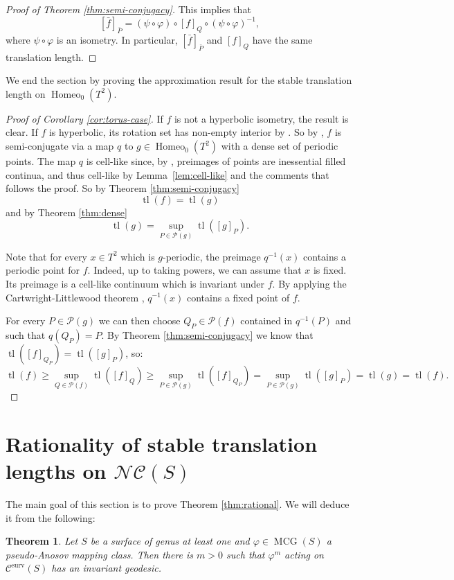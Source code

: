 \documentclass{amsart}
\newcommand{\Pf}{\mathcal{P}}
\newcommand{\C}{\mathcal{C}}
\newcommand{\NC}{\mathcal{NC}}
\DeclareMathOperator{\Homeo}{Homeo}
\DeclareMathOperator{\mcg}{MCG}
\newcommand{\tl}[1]{\operatorname{tl}(#1)}
\newcommand{\Csurv}{\C^{\text{surv}}}
\newtheorem{thm}{Theorem}[section]
\theoremstyle{definition}
\begin{document}
\begin{proof}[Proof of Theorem \ref{thm:semi-conjugacy}]
This implies that \[[\bar{f}]_{\bar{P}}=(\psi\circ\varphi)\circ [f]_Q \circ (\psi\circ\varphi)^{-1},\] where \(\psi\circ\varphi\) is an isometry. In particular, \([\bar{f}]_{\bar{P}}\) and \([f]_Q\) have the same translation length.
\end{proof}

We end the section by proving the approximation result for the stable translation length on \(\Homeo_0(T^2)\).

\begin{proof}[Proof of Corollary \ref{cor:torus-case}]
If \(f\) is not a hyperbolic isometry, the result is clear. If \(f\) is hyperbolic, its rotation set has non-empty interior by \cite{bhmmw_rotation}. So by \cite{gst_fully}, \(f\) is semi-conjugate via a map \(q\) to \(g\in\Homeo_0(T^2)\) with a dense set of periodic points. The map \(q\) is cell-like since, by \cite[Corollary 5.7]{gst_fully}, preimages of points are inessential filled continua, and thus cell-like by Lemma~\ref{lem:cell-like} and the comments that follows the proof. So by Theorem \ref{thm:semi-conjugacy}
\[\tl{f}=\tl{g}\] 
and by Theorem \ref{thm:dense}
\[\tl{g}=\sup_{P\in\Pf(g)}\tl{[g]_{P}}.\]

Note that for every \(x\in T^2\) which is \(g\)-periodic, the preimage \(q^{-1}(x)\) contains a periodic point for \(f\). Indeed, up to taking powers, we can assume that \(x\) is fixed. Its preimage is a cell-like continuum which is invariant under \(f\). By applying the Cartwright-Littlewood theorem \cite{cl_some}, \(q^{-1}(x)\) contains a fixed point of \(f\).

For every \(P\in\Pf(g)\) we can then choose \(Q_P\in\Pf(f)\) contained in \(q^{-1}(P)\) and such that \(q(Q_P)=P\). By Theorem \ref{thm:semi-conjugacy} we know that \(\tl{[f]_{Q_P}}=\tl{[g]_{P}}\), so:
\[\tl{f}\geq \sup_{Q\in\Pf(f)}\tl{[f]_Q}\geq \sup_{P\in\Pf(g)}\tl{[f]_{Q_P}}=\sup_{P\in\Pf(g)}\tl{[g]_P}=\tl{g}=\tl{f}.\]
\end{proof}

\section{Rationality of stable translation lengths on \(\NC(S)\)}\label{sec:rational}
The main goal of this section is to prove Theorem \ref{thm:rational}. We will deduce it from the following:

\begin{thm}\label{thm:rational-surviving}
Let \(S\) be a surface of genus at least one and \(\varphi\in\mcg(S)\) a pseudo-Anosov mapping class. Then there is \(m>0\) such that \(\varphi^m\) acting on \(\Csurv(S)\) has an invariant geodesic.
\end{thm}
\end{document}
